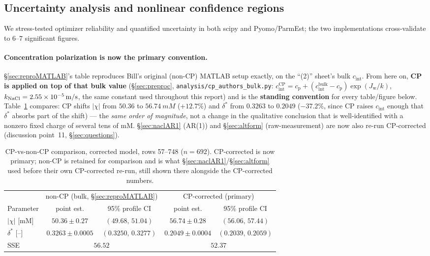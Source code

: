 \documentclass[11pt]{article}
\newcommand{\Jw}{J_{\mathrm{w}}}
\newcommand{\dstar}{\delta^{*}}
\newcommand{\cint}{c_{\mathrm{int}}}
\newcommand{\cp}{c_{\mathrm{p}}}
\begin{document}
\subsection{Uncertainty analysis and nonlinear confidence regions}\label{sec:naclUQ}
We stress-tested optimizer reliability and quantified uncertainty in both scipy
and Pyomo/ParmEst; the two implementations cross-validate to $6$--$7$ significant
figures.

\paragraph{Concentration polarization is now the primary convention.}
\S\ref{sec:reproMATLAB}'s table reproduces Bill's original (non-CP) MATLAB setup
exactly, on the ``(2)'' sheet's bulk $\cint$. From here on, \textbf{CP is applied
on top of that bulk value} (\S\ref{sec:preproc}, \texttt{analysis/cp\_authors\_bulk.py}:
$\cint^{\mathrm{CP}}=\cp+(\cint^{\mathrm{bulk}}-\cp)\exp(\Jw/k)$, $k_{\ce{NaCl}}=\SI{2.55e-5}{m/s}$,
the same constant used throughout this report) and is the \textbf{standing
convention} for
every table/figure below. Table~\ref{tab:cpvsnoncp} compares: CP shifts
$|\chi|$ from $50.36$ to $\SI{56.74}{mM}$ ($+12.7\%$) and $\dstar$ from $0.3263$
to $0.2049$ ($-37.2\%$, since CP raises $\cint$ enough that $\dstar$ absorbs part
of the shift) --- the \emph{same order of magnitude}, not a change in the
qualitative conclusion that  is well-identified with a nonzero fixed
charge of several tens of mM. \S\ref{sec:naclAR1} (AR(1)) and
\S\ref{sec:altform} (raw-measurement) are now also re-run CP-corrected
(discussion point~11, \S\ref{sec:questions}).

\begin{table}[H]
\centering\small
\begin{tabular}{lcccc}
\toprule
& \multicolumn{2}{c}{non-CP (bulk, \S\ref{sec:reproMATLAB})} & \multicolumn{2}{c}{CP-corrected (primary)} \\
Parameter & point est. & 95\% profile CI & point est. & 95\% profile CI \\
\midrule
$|\chi|$ [\si{mM}] & $50.36\pm0.27$ & $(49.68,\,51.04)$ & $56.74\pm0.28$ & $(56.06,\,57.44)$ \\
$\dstar$ [--] & $0.3263\pm0.0005$ & $(0.3250,\,0.3277)$ & $0.2049\pm0.0004$ & $(0.2039,\,0.2059)$ \\
SSE & \multicolumn{2}{c}{$56.52$} & \multicolumn{2}{c}{$52.37$} \\
\bottomrule
\end{tabular}
\caption{ CP-vs-non-CP comparison, corrected model, rows 57--748
($n=692$). CP-corrected is now primary; non-CP is retained for comparison and
is what \S\ref{sec:naclAR1}/\S\ref{sec:altform} used before their own
CP-corrected re-run, still shown there alongside the CP-corrected numbers.}
\label{tab:cpvsnoncp}
\end{table}
\end{document}
